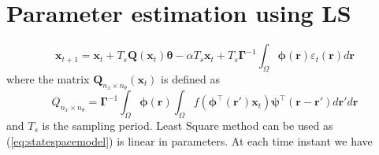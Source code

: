 \documentclass[onecolumn,draftcls]{IEEEtran}
\begin{document}
\section{Parameter estimation using LS}
\begin{equation}
 \mathbf x_{t+1}=\mathbf x_{t}+T_s \mathbf Q(\mathbf x_t)\mathbf \theta-\alpha T_s\mathbf x_t+T_s\boldsymbol\Gamma^{-1}\int_\Omega\boldsymbol\phi(\mathbf r)\varepsilon_t(\mathbf r)d\mathbf r
\label{eq:statespacemodel}
\end{equation}
where the matrix $\mathbf Q_{n_x \times n_{\theta}}(\mathbf x_t)$ is defined as
\begin{equation}
 Q_{n_x \times n_{\theta}}=\boldsymbol\Gamma^{-1}\int_\Omega\boldsymbol\phi(\mathbf r)\int_\Omega f(\boldsymbol\phi^\top(\mathbf r')\mathbf x_t)\boldsymbol\psi^\top(\mathbf r-\mathbf r')d\mathbf r'd\mathbf r
\end{equation}
and $T_s$ is the sampling period. Least Square method can be used as (\ref{eq:statespacemodel}) is linear in parameters. At each time instant we have
\end{document}
